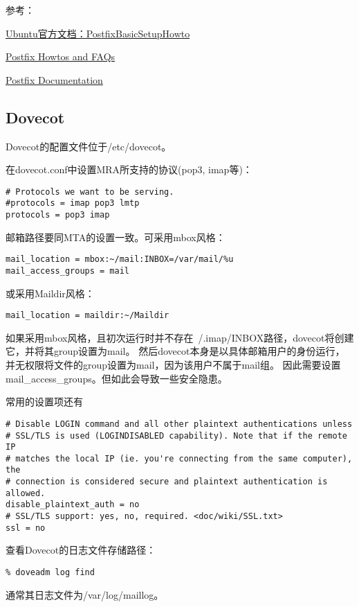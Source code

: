参考：

\href{https://help.ubuntu.com/community/PostfixBasicSetupHowto}{Ubuntu官方文档：PostfixBasicSetupHowto}

\href{Postfix Howtos and FAQs}{Postfix Howtos and FAQs}

\href{http://www.postfix.org/documentation.html}{Postfix Documentation}



\subsection{Dovecot}

Dovecot的配置文件位于/etc/dovecot。

在dovecot.conf中设置MRA所支持的协议(pop3, imap等)：

\begin{verbatim}
# Protocols we want to be serving.
#protocols = imap pop3 lmtp
protocols = pop3 imap
\end{verbatim}

邮箱路径要同MTA的设置一致。可采用mbox风格：
\begin{verbatim}
mail_location = mbox:~/mail:INBOX=/var/mail/%u
mail_access_groups = mail
\end{verbatim}
或采用Maildir风格：
\begin{verbatim}
mail_location = maildir:~/Maildir
\end{verbatim}

如果采用mbox风格，且初次运行时并不存在~/.imap/INBOX路径，dovecot将创建它，并将其group设置为mail。
然后dovecot本身是以具体邮箱用户的身份运行，并无权限将文件的group设置为mail，因为该用户不属于mail组。
因此需要设置mail\_access\_groups。但如此会导致一些安全隐患。

常用的设置项还有
\begin{verbatim}
# Disable LOGIN command and all other plaintext authentications unless
# SSL/TLS is used (LOGINDISABLED capability). Note that if the remote IP
# matches the local IP (ie. you're connecting from the same computer), the
# connection is considered secure and plaintext authentication is allowed.
disable_plaintext_auth = no
# SSL/TLS support: yes, no, required. <doc/wiki/SSL.txt>
ssl = no
\end{verbatim}


查看Dovecot的日志文件存储路径：
\begin{verbatim}
% doveadm log find
\end{verbatim}
通常其日志文件为/var/log/maillog。

